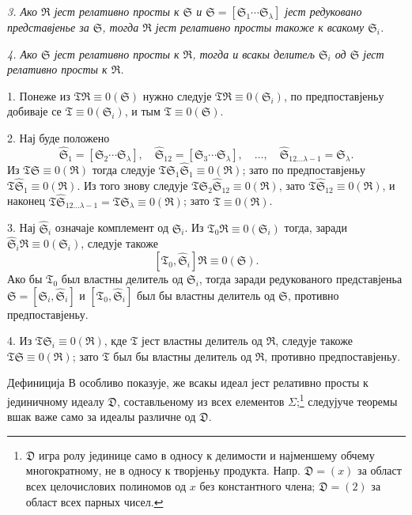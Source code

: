 ﻿\documentclass[11pt]{article}
\newcommand{\ideal}[1]{\mathfrak{#1}}
\begin{document}
\emph{3. Ако \(\ideal R\) јест релативно просты к \(\ideal S\) и \(\ideal S=[\ideal S_1\cdots\ideal S_\lambda]\) јест редуковано представјенье за \(\ideal S\), тогда \(\ideal R\) јест релативно просты такоже к всакому \(\ideal S_i\).}

\emph{4. Ако \(\ideal S\) јест релативно просты к \(\ideal R\), тогда и всакы делитељ \(\ideal S_i\) од \(\ideal S\) јест релативно просты к \(\ideal R\).}

1. Понеже из \(\ideal T\ideal R\equiv0(\ideal S)\) нужно следује \(\ideal T\ideal R\equiv0(\ideal S_i)\), по предпоставјеньу добиваје се \(\ideal T\equiv0(\ideal S_i)\), и тым \(\ideal T\equiv0(\ideal S)\).

2. Нај буде положено
\[
 \widehat{\ideal S}_1=[\ideal S_2\cdots\ideal S_\lambda],\quad
 \widehat{\ideal S}_{12}=[\ideal S_3\cdots\ideal S_\lambda],\quad \ldots,\quad
 \widehat{\ideal S}_{12\ldots\lambda-1}=\ideal S_\lambda .
\]
Из \(\ideal T\ideal S\equiv0(\ideal R)\) тогда следује \(\ideal T\ideal S_1\widehat{\ideal S}_1\equiv0(\ideal R)\); зато по предпоставјеньу \(\ideal T\widehat{\ideal S}_1\equiv0(\ideal R)\). Из того знову следује \(\ideal T\ideal S_2\widehat{\ideal S}_{12}\equiv0(\ideal R)\), зато \(\ideal T\widehat{\ideal S}_{12}\equiv0(\ideal R)\), и наконец \(\ideal T\widehat{\ideal S}_{12\ldots\lambda-1}=\ideal T\ideal S_\lambda\equiv0(\ideal R)\); зато \(\ideal T\equiv0(\ideal R)\).

3. Нај \(\widehat{\ideal S}_i\) означаје комплемент од \(\ideal S_i\). Из \(\ideal T_0\ideal R\equiv0(\ideal S_i)\) тогда, заради \(\widehat{\ideal S}_i\ideal R\equiv0(\ideal S_i)\), следује такоже
\[
 [\ideal T_0,\widehat{\ideal S}_i]\ideal R\equiv0(\ideal S).
\]
Ако бы \(\ideal T_0\) был властны делитель од \(\ideal S_i\), тогда заради редукованого представјеньа \(\ideal S=[\ideal S_i,\widehat{\ideal S}_i]\) и \([\ideal T_0,\widehat{\ideal S}_i]\) был бы властны делитель од \(\ideal S\), противно предпоставјеньу.

4. Из \(\ideal T\ideal S_i\equiv0(\ideal R)\), кде \(\ideal T\) јест властны делитель од \(\ideal R\), следује такоже \(\ideal T\ideal S\equiv0(\ideal R)\); зато \(\ideal T\) был бы властны делитель од \(\ideal R\), противно предпоставјеньу.

Дефиниција В особливо показује, же всакы идеал јест релативно просты к јединичному идеалу \(\ideal D\), составльеному из всех елементов \(\Sigma\);\footnote{\(\ideal D\) игра ролу јединице само в односу к делимости и најменшему обчему многократному, не в односу к творјеньу продукта. Напр. \(\ideal D=(x)\) за област всех целочислових полиномов од \(x\) без константного члена; \(\ideal D=(2)\) за област всех парных чисел.} следујуче теоремы вшак важе само за идеалы различне од \(\ideal D\).
\end{document}
